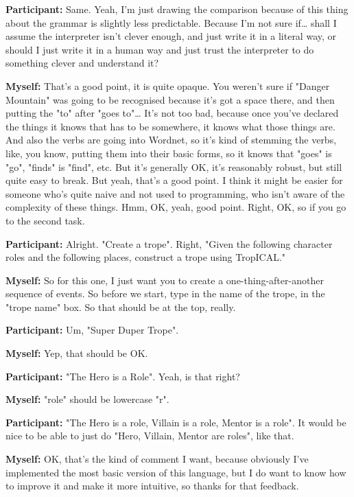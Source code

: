 \documentclass[11pt]{report}
\begin{document}
\begin{linenumbers}
\textbf{Participant:} Same. Yeah, I'm just drawing the comparison because of
this thing about the grammar is slightly less predictable. Because I'm not sure
if\ldots{} shall I assume the interpreter isn't clever enough, and just write it
in a literal way, or should I just write it in a human way and just trust the
interpreter to do something clever and understand it?

\textbf{Myself:} That's a good point, it is quite opaque. You weren't sure if "Danger Mountain" was going to be recognised because it's got a space there, and then putting the "to" after "goes to"\ldots{} It's not too bad, because once you've declared the things it knows that has to be somewhere, it knows what those things are. And also the verbs are going into Wordnet, so it's kind of stemming the verbs, like, you know, putting them into their basic forms, so it knows that "goes" is "go", "finds" is "find", etc. But it's generally OK, it's reasonably robust, but still quite easy to break. But yeah, that's a good point. I think it might be easier for someone who's quite naive and not used to programming, who isn't aware of the complexity of these things. Hmm, OK, yeah, good point. Right, OK, so if you go to the second task.

\textbf{Participant:} Alright. "Create a trope". Right, "Given the following character roles and the following places, construct a trope using TropICAL."

\textbf{Myself:} So for this one, I just want you to create a one-thing-after-another sequence of events. So before we start, type in the name of the trope, in the "trope name" box. So that should be at the top, really.

\textbf{Participant:} Um, "Super Duper Trope".

\textbf{Myself:} Yep, that should be OK.

\textbf{Participant:} "The Hero is a Role". Yeah, is that right?

\textbf{Myself:} "role" should be lowercase "r".

\textbf{Participant:} "The Hero is a role, Villain is a role, Mentor is a role". It would be nice to be able to just do "Hero, Villain, Mentor are roles", like that.

\textbf{Myself:} OK, that's the kind of comment I want, because obviously I've implemented the most basic version of this language, but I do want to know how to improve it and make it more intuitive, so thanks for that feedback.


\end{linenumbers}
\end{document}
